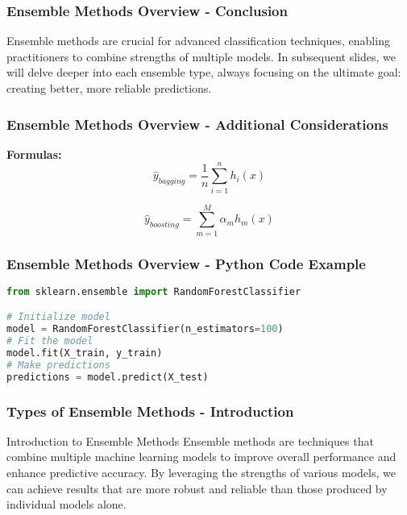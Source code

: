 \documentclass[aspectratio=169]{beamer}
\begin{document}
\begin{frame}[fragile]
    \frametitle{Ensemble Methods Overview - Conclusion}
    Ensemble methods are crucial for advanced classification techniques, enabling practitioners to combine strengths of multiple models. In subsequent slides, we will delve deeper into each ensemble type, always focusing on the ultimate goal: creating better, more reliable predictions.
\end{frame}

\begin{frame}[fragile]
    \frametitle{Ensemble Methods Overview - Additional Considerations}
    \textbf{Formulas:}
    \begin{equation}
        \hat{y}_{bagging} = \frac{1}{n} \sum_{i=1}^{n} h_i(x) 
    \end{equation}

    \begin{equation}
        \hat{y}_{boosting} = \sum_{m=1}^{M} \alpha_m h_m(x)
    \end{equation}
\end{frame}

\begin{frame}[fragile]
    \frametitle{Ensemble Methods Overview - Python Code Example}
    \begin{lstlisting}[language=Python]
from sklearn.ensemble import RandomForestClassifier

# Initialize model
model = RandomForestClassifier(n_estimators=100)
# Fit the model
model.fit(X_train, y_train)
# Make predictions
predictions = model.predict(X_test)
    \end{lstlisting}
\end{frame}

\begin{frame}[fragile]
    \frametitle{Types of Ensemble Methods - Introduction}
    \begin{block}{Introduction to Ensemble Methods}
        Ensemble methods are techniques that combine multiple machine learning models to improve overall performance and enhance predictive accuracy. By leveraging the strengths of various models, we can achieve results that are more robust and reliable than those produced by individual models alone.
    \end{block}
\end{frame}
\end{document}
